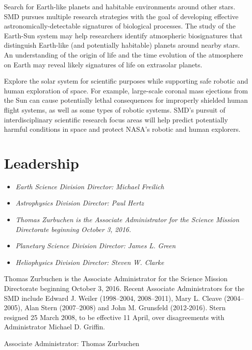 Search for Earth-like planets and habitable environments around other
stars. SMD pursues multiple research strategies with the goal of
developing effective astronomically-detectable signatures of biological
processes. The study of the Earth-Sun system may help researchers
identify atmospheric biosignatures that distinguish Earth-like (and
potentially habitable) planets around nearby stars. An understanding of
the origin of life and the time evolution of the atmosphere on Earth may
reveal likely signatures of life on extrasolar planets.

Explore the solar system for scientific purposes while supporting safe
robotic and human exploration of space. For example, large-scale coronal
mass ejections from the Sun can cause potentially lethal consequences
for improperly shielded human flight systems, as well as some types of
robotic systems. SMD's pursuit of interdisciplinary scientific research
focus areas will help predict potentially harmful conditions in space
and protect NASA's robotic and human explorers.

\section{Leadership}\label{leadership}

\begin{itemize}
\item
  \emph{Earth Science Division Director: Michael Freilich}
\item
  \emph{Astrophysics Division Director: Paul Hertz}
\item
  \emph{Thomas Zurbuchen is the Associate Administrator for the Science
  Mission Directorate beginning October 3, 2016.}
\item
  \emph{Planetary Science Division Director: James L. Green}
\item
  \emph{Heliophysics Division Director: Steven W. Clarke}
\end{itemize}

Thomas Zurbuchen is the Associate Administrator for the Science Mission
Directorate beginning October 3, 2016. Recent Associate Administrators
for the SMD include Edward J. Weiler (1998--2004, 2008--2011), Mary L.
Cleave (2004--2005), Alan Stern (2007--2008) and John M. Grunsfeld
(2012-2016). Stern resigned 25 March 2008, to be effective 11 April,
over disagreements with Administrator Michael D. Griffin.

Associate Administrator: Thomas Zurbuchen

